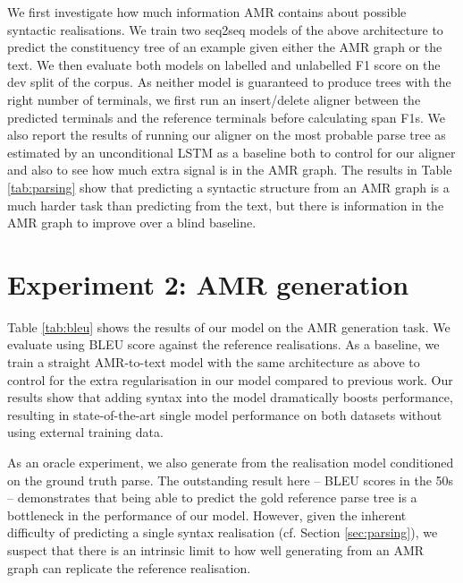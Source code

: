 We first investigate how much information AMR contains about possible syntactic realisations. We train two seq2seq models of the above architecture to predict the constituency tree of an example given either the AMR graph or the text. We then evaluate both models on labelled and unlabelled F1 score on the dev split of the corpus. As neither model is guaranteed to produce trees with the right number of terminals, we first run an insert/delete aligner between the predicted terminals and the reference terminals before calculating span F1s. We also report the results of running our aligner on the most probable parse tree as estimated by an unconditional LSTM as a baseline both to control for our aligner and also to see how much extra signal is in the AMR graph. The results in Table \ref{tab:parsing} show that predicting a syntactic structure from an AMR graph is a much harder task than predicting from the text, but there is information in the AMR graph to improve over a blind baseline.

\section{Experiment 2: AMR generation}
Table \ref{tab:bleu} shows the results of our model on the AMR generation task. We evaluate using BLEU score \citep{Papineni:02} against the reference realisations. As a baseline, we train a straight AMR-to-text model with the same architecture as above to control for the extra regularisation in our model compared to previous work. Our results show that adding syntax into the model dramatically boosts performance, resulting in state-of-the-art single model performance on both datasets without using external training data.

As an oracle experiment, we also generate from the realisation model conditioned on the ground truth parse. The outstanding result here -- BLEU scores in the 50s -- demonstrates that being able to predict the gold reference parse tree is a bottleneck in the performance of our model. However, given the inherent difficulty of predicting a single syntax realisation (cf. Section \ref{sec:parsing}), we suspect that there is an intrinsic limit to how well generating from an AMR graph can replicate the reference realisation.


